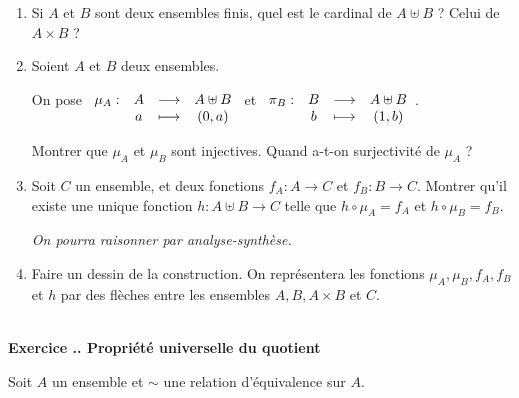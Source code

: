 \documentclass{article}
\newcommand{\fonction}[5]{\raisebox{-0.5\baselineskip}{$\begin{array}{lccc}
    #1: & #2 & \longrightarrow & #3 \\
        & #4 & \longmapsto & #5 \end{array}$}}
\newcounter{exo}
\newcommand{\exercice}[1][\null]{\textbf{\\ Exercice \thesection.\theexo. #1} \addtocounter{exo}{1}}
\begin{document}
\begin{enumerate}

\item Si $A$ et $B$ sont deux ensembles finis, quel est le cardinal de $A \uplus B$ ? Celui de $A \times B$ ?
\item Soient $A$ et $B$ deux ensembles.

On pose $\fonction{\mu_A}{A}{A\uplus B}{a}{(0,a)}$ et $\fonction{\pi_B}{B}{A\uplus B}{b}{(1,b)}$.

Montrer que $\mu_A$ et $\mu_B$ sont injectives. Quand a-t-on surjectivité de $\mu_A$ ?

\item Soit $C$ un ensemble, et deux fonctions $f_A : A \rightarrow C$ et $f_B : B \rightarrow C$. Montrer qu'il existe une unique fonction $h : A \uplus B \rightarrow C$ telle que $h \circ \mu_A  = f_A$ et $h \circ \mu_B  = f_B$. 

\emph{On pourra raisonner par analyse-synthèse.}

\item Faire un dessin de la construction. On représentera les fonctions $\mu_A, \mu_B, f_A, f_B$ et $h$ par des flèches entre les ensembles $A, B, A \times B$ et $C$.

\end{enumerate}


\exercice[Propriété universelle du quotient]

Soit $A$ un ensemble et $\sim$ une relation d'équivalence sur $A$.
\end{document}
